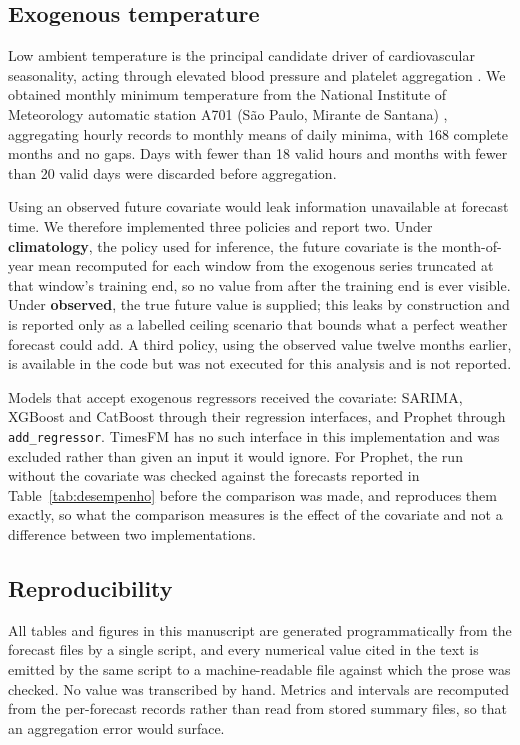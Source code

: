 \subsection{Exogenous temperature}

Low ambient temperature is the principal candidate driver of cardiovascular seasonality,
acting through elevated blood pressure and platelet aggregation \citep{analitis2008,
phung2016}. We obtained monthly minimum temperature from the National Institute of
Meteorology automatic station A701 (S\~ao Paulo, Mirante de Santana) \citep{inmet},
aggregating hourly records to monthly means of daily minima, with 168 complete months and
no gaps. Days with fewer than 18 valid hours and months with fewer than 20 valid days were
discarded before aggregation.

Using an observed future covariate would leak information unavailable at forecast time. We
therefore implemented three policies and report two. Under \textbf{climatology}, the policy
used for inference, the future covariate is the month-of-year mean recomputed for each
window from the exogenous series truncated at that window's training end, so no value from
after the training end is ever visible. Under \textbf{observed}, the true future value is
supplied; this leaks by construction and is reported only as a labelled ceiling scenario
that bounds what a perfect weather forecast could add. A third policy, using the observed
value twelve months earlier, is available in the code but was not executed for this
analysis and is not reported.

Models that accept exogenous regressors received the covariate: SARIMA, XGBoost and
CatBoost through their regression interfaces, and Prophet through
\texttt{add\_regressor}. TimesFM has no such interface in this implementation and was
excluded rather than given an input it would ignore. For Prophet, the run without the
covariate was checked against the forecasts reported in Table~\ref{tab:desempenho} before
the comparison was made, and reproduces them exactly, so what the comparison measures is
the effect of the covariate and not a difference between two implementations.

\subsection{Reproducibility}

All tables and figures in this manuscript are generated programmatically from the forecast
files by a single script, and every numerical value cited in the text is emitted by the
same script to a machine-readable file against which the prose was checked. No value was
transcribed by hand. Metrics and intervals are recomputed from the per-forecast records
rather than read from stored summary files, so that an aggregation error would surface.

